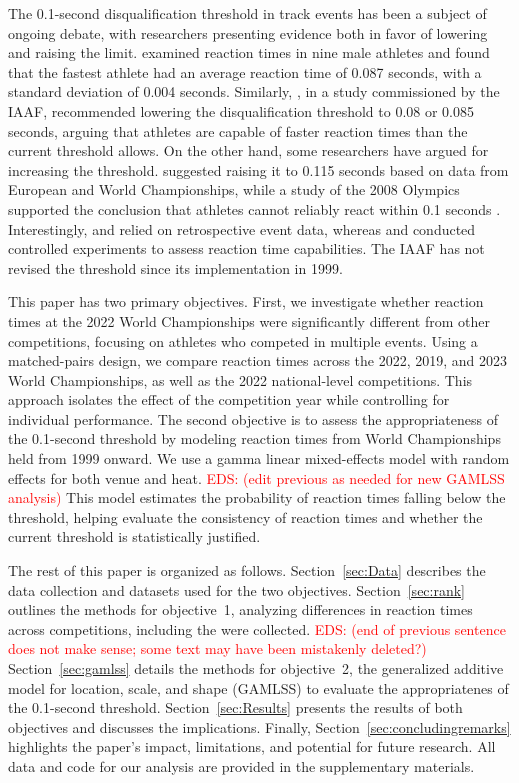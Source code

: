 \documentclass[12pt, letterpaper]{article}
\newcommand{\eds}[1]{\textcolor{red}{EDS: (#1)}}
\begin{document}
The 0.1-second disqualification threshold in track events has been 
a subject of ongoing debate, with researchers presenting evidence 
both in favor of lowering and raising the
limit. \citet{pain2007sprint} examined
reaction times in nine male athletes and found that the fastest athlete 
had an average reaction time of 0.087 seconds, with a standard deviation 
of 0.004 seconds. Similarly, \citet{komi2009iaaf}, in a study commissioned 
by the IAAF, recommended lowering the disqualification threshold to 0.08 
or 0.085 seconds, arguing that athletes are capable of faster reaction 
times than the current threshold allows. On the other hand, some 
researchers have argued for increasing the threshold.
\citet{brosnan2017effects} suggested raising it to 0.115 seconds based
on data from European and World Championships, while a study of the
2008 Olympics supported the conclusion that athletes cannot reliably
react within 0.1 seconds \citep{lipps2011implications}. Interestingly,
\citet{brosnan2017effects} and \citet{lipps2011implications} relied on
retrospective event data, whereas \citet{pain2007sprint} and
\citet{komi2009iaaf} conducted controlled experiments to assess
reaction time capabilities. The IAAF has not revised the threshold
since its implementation in 1999.


This paper has two primary objectives. First, we investigate whether 
reaction times at the 2022 World Championships were significantly 
different from other competitions, focusing on athletes who competed 
in multiple events. Using a matched-pairs design, we compare reaction 
times across the 2022, 2019, and 2023 World Championships, as well as 
the 2022 national-level competitions. This approach isolates the 
effect of the competition year while controlling for individual 
performance. The second objective is to assess the 
appropriateness of the 0.1-second threshold by modeling reaction 
times from World Championships held from 1999 onward. We use a gamma 
linear mixed-effects model with random effects for both venue and heat. 
\eds{edit previous as needed for new GAMLSS analysis}
This model estimates the probability of reaction times falling below 
the threshold, helping evaluate the consistency of reaction times and 
whether the current threshold is statistically justified.


The rest of this paper is organized as follows. Section~\ref{sec:Data} 
describes the data collection and datasets used for the two
objectives. Section~\ref{sec:rank} outlines the methods for
objective~1, analyzing differences in reaction times across
competitions, including the were collected. 
\eds{end of previous sentence does not make sense; some text may have been 
mistakenly deleted?}
Section~\ref{sec:gamlss}
details the methods for objective~2, the generalized additive model
for location, scale, and shape (GAMLSS) to evaluate the appropriatenes
of the 0.1-second threshold. Section~\ref{sec:Results} presents the
results of both objectives and discusses the implications.
Finally, Section~\ref{sec:concludingremarks} highlights the 
paper’s impact, limitations, and potential for future research.
All data and code for our analysis 
are provided in the supplementary materials.
\end{document}
